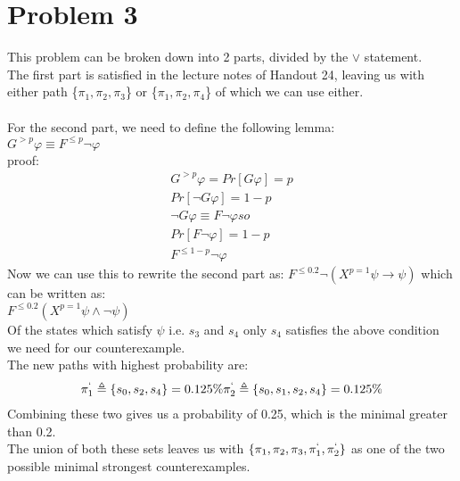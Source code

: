 \documentclass{article}
\begin{document}
\section{Problem 3}
This problem can be broken down into 2 parts, divided by the $\lor$ statement. \\
The first part is satisfied in the lecture notes of Handout 24, leaving us with either path \{$\pi_1, \pi_2, \pi_3$\} or \{$\pi_1, \pi_2, \pi_4$\} of which we can use either.\\
\\For the second part, we need to define the following lemma:\\
$G^{>p} \varphi \equiv F^{\leq p} \neg \varphi$\\
proof:\\
\begin{align*}
	G^{>p} \varphi = Pr[G \varphi] = p\\
	Pr[\neg G \varphi] = 1 - p\\
	\neg G \varphi \equiv F \neg \varphi so\\
	Pr[F \neg \varphi] = 1 - p\\
	F^{\leq 1-p} \neg \varphi
\end{align*}
Now we can use this to rewrite the second part as: $F^{\leq 0.2} \neg (X^{p=1} \psi \to \psi)$ which can be written as:
\\ $F^{\leq 0.2} (X^{p=1} \psi \land \neg \psi)$\\
Of the states which satisfy $\psi$ i.e. $s_3$ and $s_4$ only $s_4$ satisfies the above condition we need for our counterexample.\\
The new paths with highest probability are:\\
\begin{align*}
	\pi^`_1 \triangleq \{s_0,s_2,s_4\} = 0.125\%
	\pi^`_2 \triangleq \{s_0,s_1,s_2,s_4\} = 0.125\%
\end{align*}
Combining these two gives us a probability of 0.25, which is the minimal greater than 0.2.\\
The union of both these sets leaves us with $\{\pi_1, \pi_2, \pi_3, \pi^`_1, \pi^`_2\}$ as one of the two possible minimal strongest counterexamples.
\end{document}
